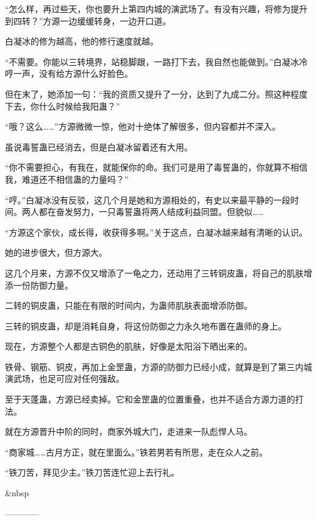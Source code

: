 \begin{this_body}
“怎么样，再过些天，你也要升上第四内城的演武场了。有没有兴趣，将修为提升到四转？”方源一边缓缓转身，一边开口道。

白凝冰的修为越高，他的修行速度就越。

“不需要。你能以三转境界，站稳脚跟，一路打下去，我自然也能做到。”白凝冰冷哼一声，没有给方源什么好脸色。

但在末了，她添加一句：“我的资质又提升了一分，达到了九成二分。照这种程度下去，你什么时候给我阳蛊？”

“哦？这么……”方源微微一惊，他对十绝体了解很多，但内容都并不深入。

虽说毒誓蛊已经消去，但是白凝冰留着还有大用。

“你不需要担心，有我在，就能保你的命。我们可是用了毒誓蛊的，你就算不相信我，难道还不相信蛊的力量吗？”

“哼。”白凝冰没有反驳，这几个月是她和方源相处的，有史以来最平静的一段时间。两人都在奋发努力，一只毒誓蛊将两人结成利益同盟。但貌似……

“方源这个家伙，成长得，收获得多啊。”关于这点，白凝冰越来越有清晰的认识。

她的进步很大，但方源大。

这几个月来，方源不仅又增添了一龟之力，还动用了三转铜皮蛊，将自己的肌肤增添一份防御力量。

二转的铜皮蛊，只能在有限的时间内，为蛊师肌肤表面增添防御。

三转的铜皮蛊，却是消耗自身，将这份防御之力永久地布置在蛊师的身上。

现在，方源整个人都是古铜色的肌肤，好像是太阳浴下晒出来的。

铁骨、钢筋、铜皮，再加上金罡蛊，方源的防御力已经小成，就算是到了第三内城演武场，也足可应对任何强敌。

至于天蓬蛊，方源已经卖掉。它和金罡蛊的位置重叠，也并不适合方源力道的打法。

就在方源晋升中阶的同时，商家外城大门，走进来一队彪悍人马。

“商家城……古月方正，就在里面么。”铁若男若有所思，走在众人之前。

“铁刀苦，拜见少主。”铁刀苦连忙迎上去行礼。

\&nbsp

------------

\end{this_body}

